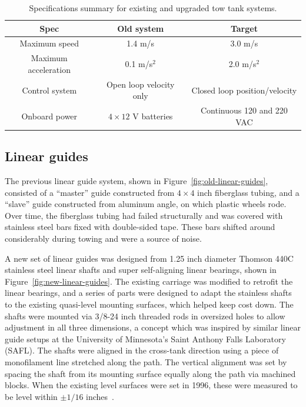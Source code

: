 \begin{table}
\centering
\begin{tabular}{c|c|c}
Spec & Old system & Target \\ 
\hline
Maximum speed & 1.4 m/s  & 3.0 m/s \\ 
Maximum acceleration & 0.1 m/s$^2$ & 2.0 m/s$^2$ \\ 
Control system & Open loop velocity only & Closed loop position/velocity \\ 
Onboard power & $4\times12$ V batteries & Continuous 120 and 220 VAC \\ 
\end{tabular}
\caption{Specifications summary for existing and upgraded tow tank systems.} 
\label{tab:tow-tank-specs}
\end{table}


\subsection{Linear guides}

The previous linear guide system, shown in Figure~\ref{fig:old-linear-guides},
consisted of a ``master'' guide constructed from $4 \times 4$ inch fiberglass
tubing, and a ``slave'' guide constructed from aluminum angle, on which plastic
wheels rode. Over time, the fiberglass tubing had failed structurally and was
covered with stainless steel bars fixed with double-sided tape. These bars
shifted around considerably during towing and were a source of noise.

A new set of linear guides was designed from 1.25 inch diameter Thomson 440C
stainless steel linear shafts and super self-aligning linear bearings, shown in
Figure~\ref{fig:new-linear-guides}. The existing carriage was modified to
retrofit the linear bearings, and a series of parts were designed to adapt the
stainless shafts to the existing quasi-level mounting surfaces, which helped
keep cost down. The shafts were mounted via 3/8-24 inch threaded rods in
oversized holes to allow adjustment in all three dimensions, a concept which was
inspired by similar linear guide setups at the University of Minnesota's Saint
Anthony Falls Laboratory (SAFL). The shafts were aligned in the cross-tank
direction using a piece of monofilament line stretched along the path. The
vertical alignment was set by spacing the shaft from its mounting surface
equally along the path via machined blocks. When the existing level surfaces
were set in 1996, these were measured to be level within $\pm 1/16$
inches~\cite{Darnell1996}.

